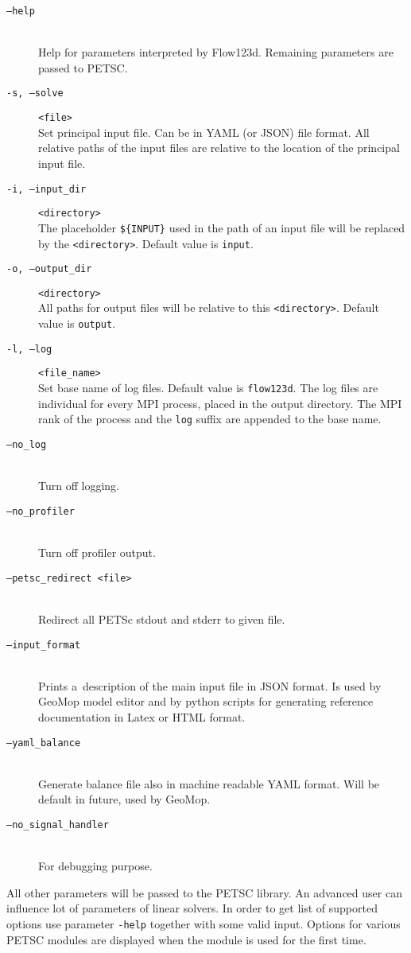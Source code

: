 \begin{description}
 \item[{\tt --help}] \hfill\\
        Help for parameters interpreted by Flow123d. Remaining parameters are passed to PETSC.
 \item[ {\tt -s, --solve} ] \verb'<file>' \hfill\\
 	 Set principal input file. Can be in YAML (or  JSON) file format. All relative paths of the input
 	 files are relative to the location of the principal input file.
 \item[{\tt -i, --input\_dir}] \verb'<directory>' \hfill\\
 	The placeholder \verb"${INPUT}" %
  	used in the path of an input file will be replaced by the \verb'<directory>'. Default value is \verb'input'.
 \item[{\tt -o, --output\_dir}] \verb'<directory>' \hfill\\
 	All paths for output files will be relative to this \verb'<directory>'. Default value is \verb'output'.
 \item[{\tt -l, --log}] \verb'<file_name>' \hfill\\
 	Set base name of log files. Default value is \verb'flow123d'. The log files are individual for every MPI process, placed in the output directory.
 	The MPI rank of the process and the \verb'log' suffix are appended to the base name.
 \item[{\tt --no\_log}] \hfill\\
        Turn off logging.
 \item[{\tt --no\_profiler}] \hfill\\
        Turn off profiler output.
 \item[{\tt --petsc\_redirect <file>}] \hfill\\
        Redirect all PETSc stdout and stderr to given file.
 \item[{\tt --input\_format}] \hfill\\
        Prints a~description of the main input file in JSON format. Is used by GeoMop model editor and by python scripts for
        generating reference documentation in Latex or HTML format.
 \item[{\tt --yaml\_balance}] \hfill\\
        Generate balance file also in machine readable YAML format. Will be default in future, used by GeoMop.
 \item[{\tt --no\_signal\_handler}] \hfill\\
        For debugging purpose.

\end{description}
All other parameters will be passed to the PETSC library. An advanced user can influence lot of parameters of linear solvers. In order to get list of supported options
use parameter \verb'-help' together with some valid input. Options for various PETSC modules are displayed when the module is used for the first time.

